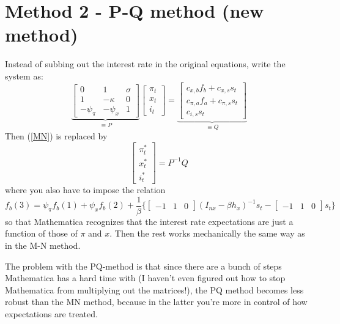 \documentclass[11pt]{article}
\renewcommand{\[}{\begin{equation}}
\renewcommand{\]}{\end{equation}}
\begin{document}
\section{Method 2 - P-Q method (new method)}
Instead of subbing out the interest rate in the original equations, write the system as:
\begin{equation}
\underbrace{\begin{bmatrix} 0& 1&  \sigma \\ 1& -\kappa & 0 \\ -\psi_{\pi} & -\psi_{x} & 1 \end{bmatrix}}_{\equiv P}\begin{bmatrix} \pi_t \\ x_t \\i_t \end{bmatrix} = \underbrace{\begin{bmatrix} c_{x,b}f_b +c_{x,s} s_t \\ c_{\pi,a}f_a +c_{\pi,s} s_t \\ c_{i,s} s_t \end{bmatrix}}_{\equiv Q}
\end{equation}
Then (\ref{MN}) is replaced by 
\begin{equation}
\begin{bmatrix} \pi_t^* \\ x_t^* \\ i_t^* \end{bmatrix} = P^{-1}Q \label{PQ}
\end{equation}
where you also have to impose the relation
\begin{equation}
f_b(3) = \psi_{\pi}f_b(1) + \psi_{x}f_b(2) + \frac{1}{\beta}\{ \begin{bmatrix} -1 &1 & 0  \end{bmatrix}(I_{nx}-\beta h_x)^{-1} s_t - \begin{bmatrix} -1 &1 & 0  \end{bmatrix}s_t  \}
\end{equation}
so that Mathematica recognizes that the interest rate expectations are just a function of those of $\pi$ and $x$. Then the rest works mechanically the same way as in the M-N method. 

The problem with the PQ-method is that since there are a bunch of steps Mathematica has a hard time with (I haven't even figured out how to stop Mathematica from multiplying out the matrices!), the PQ method becomes less robust than the MN method, because in the latter you're more in control of how expectations are treated.
\end{document}
